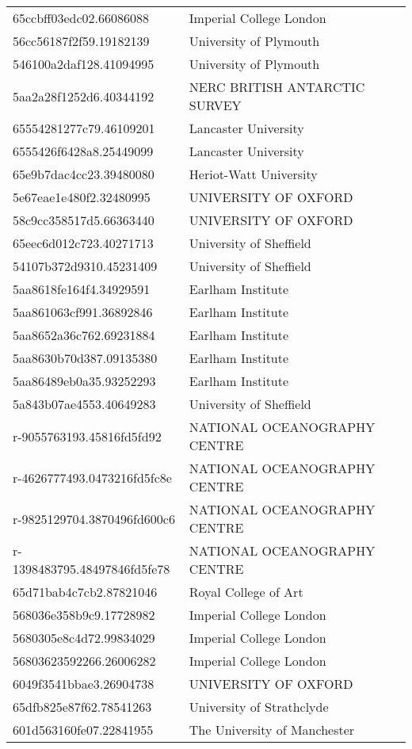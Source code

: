 \begin{tabular}{ll}
65ccbff03edc02.66086088 & Imperial College London \\
56cc56187f2f59.19182139 & University of Plymouth \\
546100a2daf128.41094995 & University of Plymouth \\
5aa2a28f1252d6.40344192 & NERC BRITISH ANTARCTIC SURVEY \\
65554281277c79.46109201 & Lancaster University \\
6555426f6428a8.25449099 & Lancaster University \\
65e9b7dac4cc23.39480080 & Heriot-Watt University \\
5e67eae1e480f2.32480995 & UNIVERSITY OF OXFORD \\
58c9cc358517d5.66363440 & UNIVERSITY OF OXFORD \\
65eec6d012c723.40271713 & University of Sheffield \\
54107b372d9310.45231409 & University of Sheffield \\
5aa8618fe164f4.34929591 & Earlham Institute \\
5aa861063cf991.36892846 & Earlham Institute \\
5aa8652a36c762.69231884 & Earlham Institute \\
5aa8630b70d387.09135380 & Earlham Institute \\
5aa86489eb0a35.93252293 & Earlham Institute \\
5a843b07ae4553.40649283 & University of Sheffield \\
r-9055763193.45816fd5fd92 & NATIONAL OCEANOGRAPHY CENTRE \\
r-4626777493.0473216fd5fc8e & NATIONAL OCEANOGRAPHY CENTRE \\
r-9825129704.3870496fd600c6 & NATIONAL OCEANOGRAPHY CENTRE \\
r-1398483795.48497846fd5fe78 & NATIONAL OCEANOGRAPHY CENTRE \\
65d71bab4c7cb2.87821046 & Royal College of Art \\
568036e358b9c9.17728982 & Imperial College London \\
5680305e8c4d72.99834029 & Imperial College London \\
56803623592266.26006282 & Imperial College London \\
6049f3541bbae3.26904738 & UNIVERSITY OF OXFORD \\
65dfb825e87f62.78541263 & University of Strathclyde \\
601d563160fe07.22841955 & The University of Manchester \\

\end{tabular}
